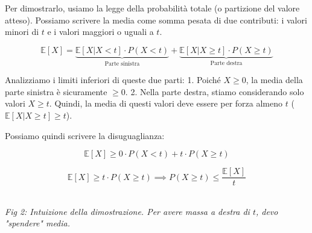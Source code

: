 Per dimostrarlo, usiamo la legge della probabilità totale (o partizione del valore atteso). Possiamo scrivere la media come somma pesata di due contributi: i valori minori di $t$ e i valori maggiori o uguali a $t$.

\begin{equation}
\mathbb{E}[X] = \underbrace{\mathbb{E}[X | X < t] \cdot P(X < t)}_{\text{Parte sinistra}} + \underbrace{\mathbb{E}[X | X \ge t] \cdot P(X \ge t)}_{\text{Parte destra}}
\end{equation}

Analizziamo i limiti inferiori di queste due parti:
1. Poiché $X \ge 0$, la media della parte sinistra è sicuramente $\ge 0$.
2. Nella parte destra, stiamo considerando solo valori $X \ge t$. Quindi, la media di questi valori deve essere per forza almeno $t$ ($\mathbb{E}[X | X \ge t] \ge t$).

Possiamo quindi scrivere la disuguaglianza:

\[
\mathbb{E}[X] \ge 0 \cdot P(X < t) + t \cdot P(X \ge t)
\]

\[
\mathbb{E}[X] \ge t \cdot P(X \ge t) \implies P(X \ge t) \le \frac{\mathbb{E}[X]}{t}
\]

\begin{center}
\\ \textit{Fig 2: Intuizione della dimostrazione. Per avere massa a destra di $t$, devo "spendere" media.}
\end{center}

